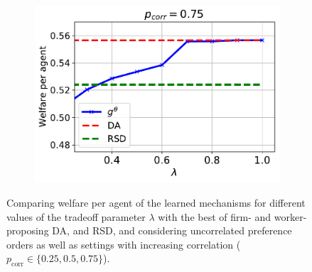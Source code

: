 \documentclass[11pt,letterpaper]{article}
\theoremstyle{definition}
\begin{document}
\begin{figure}
\begin{subfigure}[b]{0.49\textwidth}
\end{subfigure}
\begin{subfigure}[b]{0.49\textwidth}
\centering
\includegraphics[scale=0.5]{plots/wf_corr_0.75.pdf}
\end{subfigure}
\caption{\label{fig:welfare} Comparing  welfare per agent of the learned mechanisms for different values of the tradeoff parameter $\lambda$ with  the best of firm- and worker- proposing DA, and RSD, and considering uncorrelated preference orders as well as settings with increasing correlation ($p_{\mathrm{corr}}\in \{0.25, 0.5, 0.75\}$). }
\end{figure}
\end{document}

